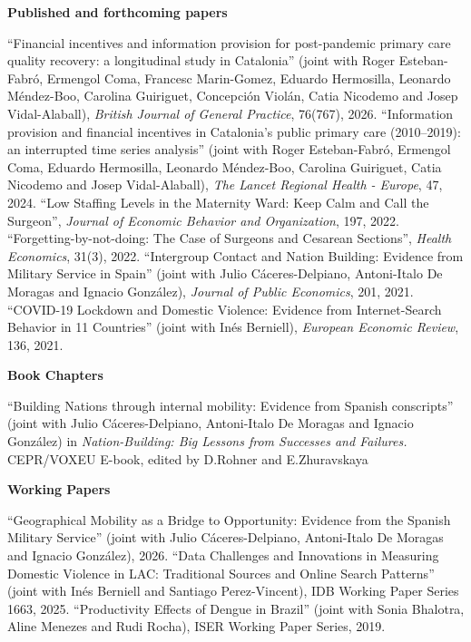 \documentclass[letterpaper]{article}
\renewenvironment{itemize}{
  \begin{list}{}{
    \setlength{\leftmargin}{1.5em}
  }
}{
  \end{list}
}
\begin{document}
\begin{itemize}
\item {\bf Published and forthcoming papers}

\leftskip 0.25in
\parindent -0.5in
	\subitem ``Financial incentives and information provision for
	post-pandemic primary care quality recovery: a longitudinal study in Catalonia'' (joint with Roger Esteban-Fabró, Ermengol Coma, Francesc Marin-Gomez, Eduardo Hermosilla, Leonardo Méndez-Boo, Carolina Guiriguet, Concepción Violán, Catia Nicodemo and Josep Vidal-Alaball), \textit{British Journal of General Practice}, 76(767), 2026.
	\subitem ``Information provision and financial incentives in Catalonia's public primary care (2010–2019): an interrupted time series analysis'' (joint with Roger Esteban-Fabró, Ermengol Coma, Eduardo Hermosilla, Leonardo Méndez-Boo, Carolina Guiriguet, Catia Nicodemo and Josep Vidal-Alaball), \textit{The Lancet Regional Health - Europe}, 47, 2024.
	\subitem ``Low Staffing Levels in the Maternity Ward: Keep Calm and Call the Surgeon'', \textit{Journal of Economic Behavior and Organization}, 197, 2022.
	\subitem ``Forgetting-by-not-doing: The Case of Surgeons and Cesarean Sections'', \textit{Health Economics}, 31(3), 2022.
	\subitem ``Intergroup Contact and Nation Building: Evidence from Military Service in Spain'' (joint with Julio C\'{a}ceres-Delpiano, Antoni-Italo De Moragas and Ignacio Gonz\'{a}lez),  \textit{Journal of Public Economics}, 201, 2021.
	\subitem ``COVID-19 Lockdown and Domestic Violence: Evidence from Internet-Search Behavior in 11 Countries'' (joint with In\'{e}s Berniell), \textit{European Economic Review}, 136, 2021.\\


\leftskip 0in
\item {\bf Book Chapters}

\leftskip 0.25in
\parindent -0.5in
\subitem ``Building Nations through internal mobility: Evidence from Spanish conscripts'' (joint with Julio C\'{a}ceres-Delpiano, Antoni-Italo De Moragas and Ignacio Gonz\'{a}lez) in \textit{Nation-Building: Big Lessons from Successes and Failures.} CEPR/VOXEU E-book, edited by D.Rohner and E.Zhuravskaya
\\

\leftskip 0in
\item {\bf Working Papers}

\leftskip 0.25in
\parindent -0.5in
\subitem ``Geographical Mobility as a Bridge to Opportunity: Evidence from the Spanish Military Service'' (joint with Julio C\'{a}ceres-Delpiano, Antoni-Italo De Moragas and Ignacio Gonz\'{a}lez), 2026.
\subitem ``Data Challenges and Innovations in Measuring Domestic Violence in LAC: Traditional Sources and Online Search Patterns'' (joint with In\'{e}s Berniell and Santiago Perez-Vincent), IDB Working Paper Series 1663, 2025.
\subitem ``Productivity Effects of Dengue in Brazil'' (joint with Sonia Bhalotra, Aline Menezes and Rudi Rocha), ISER Working Paper Series, 2019.
 \\


\end{itemize}
\end{document}

